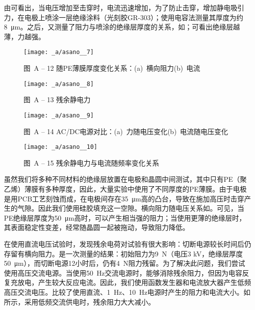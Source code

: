由可看出，当电压增加至击穿时，电流迅速增加，为了防止击穿，增加静电吸引力，在电极上喷涂一层绝缘涂料（光刻胶GR-303）；使用电容法测量其厚度为约\SI{8}{\um}。之后，又测量了阻力与喷涂的绝缘层厚度的关系，如；可看出绝缘层越薄，力越强。

\begin{figure}[tbhp]
\centering
\texttt{[image: \_a/asano\_\_7]}
\caption*{图~A -- 12\hspace{1em} 随PE薄膜厚度变化关系：\quad (a)\ 横向阻力\quad (b)\ 电流}
\end{figure}

\begin{figure}[tbhp]
\centering
\texttt{[image: \_a/asano\_\_8]}
\caption*{图~A -- 13\hspace{1em} 残余静电力}
\end{figure}

\begin{figure}[tbhp]
\centering
\texttt{[image: \_a/asano\_\_9]}
\caption*{图~A -- 14\hspace{1em} AC/DC电源对比：\quad (a)\ 力随电压变化\quad (b)\ 电流随电压变化}
\end{figure}

\begin{figure}[tbhp]
\centering
\texttt{[image: \_a/asano\_\_10]}
\caption*{图~A -- 15\hspace{1em} 残余静电力与电流随频率变化关系}
\end{figure}


虽然我们将多种不同材料的绝缘层放置在电极和晶圆中间测试，其中只有PE（聚乙烯）薄膜有多种厚度，因此，大量实验中使用了不同厚度的PE薄膜。由于电极是用PCB工艺刻蚀而成，在电极间存在\SI{35}{\um}高的凸台，导致在施加高压时击穿产生的气隙。因此我们使用硅胶填充这一空隙。横向阻力随电压关系如。可见，当PE绝缘层厚度为\SI{50}{\um}高时，可以产生相当强的阻力；当使用更薄的绝缘层时，其表面稳定性变差，经常随晶圆一起被拖动，导致阻力降低。

在使用直流电压试验时，发现残余电荷对试验有很大影响：切断电源较长时间后仍存留有横向阻力。是一次测量的结果：初始阻力为\SI{9}{\N}（电压3 kV，绝缘层厚度\SI{50}{\um}），而切断电源12小时后，仍有\SI{4}{\N}阻力残留。为了解决此问题，我们尝试使用高压交流电源。当使用\SI{50}{\Hz}交流电源时，能够消除残余阻力\footnotemark{}，但因为电容反复充放电，产生较大反应电流。因此，我们使用函数发生器和电流放大器产生低频高压交流电压。比较了使用直流、\SI{1}{\Hz}、\SI{10}{\Hz}电源时产生的阻力和电流大小。如所示，采用低频交流供电时，残余阻力大大减小。

